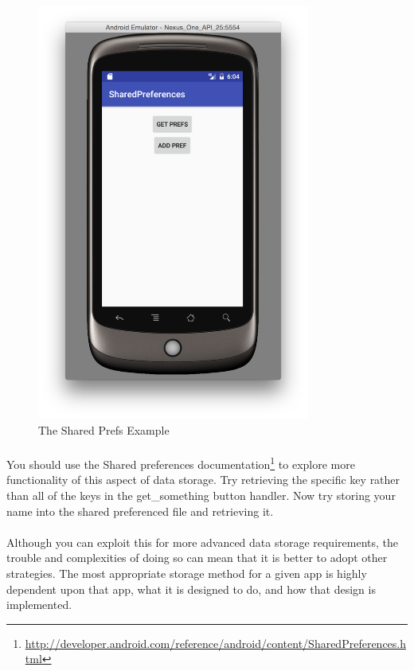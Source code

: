 \begin{figure}[H]
\centering
\includegraphics[width=0.8\textwidth]{images/sharedprefs_avd}
\caption{The Shared Prefs Example}
\label{fig:sharedprefs_avd}
\end{figure}

\paragraph{} You should use the Shared preferences documentation\footnote{\url{http://developer.android.com/reference/android/content/SharedPreferences.html}} to explore more functionality of this aspect of data storage. Try retrieving the specific key rather than all of the keys in the get\_something button handler. Now try storing your name into the shared preferenced file and retrieving it.

\paragraph{} Although you can exploit this for more advanced data storage requirements, the trouble and complexities of doing so can mean that it is better to adopt other strategies. The most appropriate storage method for a given app is highly dependent upon that app, what it is designed to do, and how that design is implemented.


